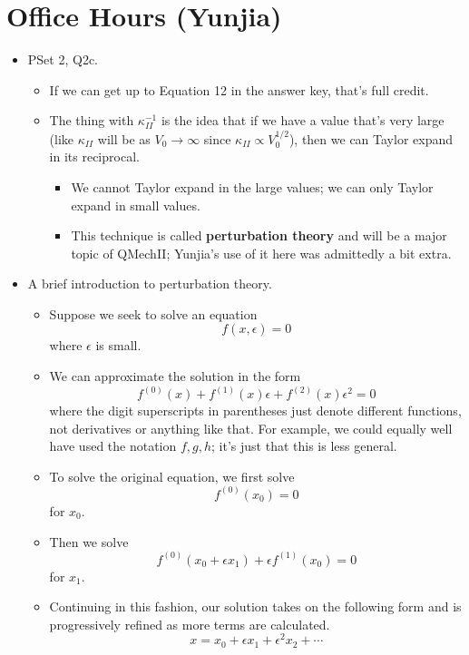 \documentclass[../notes.tex]{subfiles}
\begin{document}
\section{Office Hours (Yunjia)}
\begin{itemize}
    \item {}PSet 2, Q2c.
    \begin{itemize}
        \item If we can get up to Equation 12 in the answer key, that's full credit.
        \item The thing with $\kappa_{II}^{-1}$ is the idea that if we have a value that's very large (like $\kappa_{II}$ will be as $V_0\to\infty$ since $\kappa_{II}\propto V_0^{1/2}$), then we can Taylor expand in its reciprocal.
        \begin{itemize}
            \item We cannot Taylor expand in the large values; we can only Taylor expand in small values.
            \item This technique is called \textbf{perturbation theory} and will be a major topic of QMechII; Yunjia's use of it here was admittedly a bit extra.
        \end{itemize}
    \end{itemize}
    \item A brief introduction to perturbation theory.
    \begin{itemize}
        \item Suppose we seek to solve an equation
        \begin{equation*}
            f(x,\epsilon) = 0
        \end{equation*}
        where $\epsilon$ is small.
        \item We can approximate the solution in the form
        \begin{equation*}
            f^{(0)}(x)+f^{(1)}(x)\epsilon+f^{(2)}(x)\epsilon^2 = 0
        \end{equation*}
        where the digit superscripts in parentheses just denote different functions, not derivatives or anything like that. For example, we could equally well have used the notation $f,g,h$; it's just that this is less general.
        \item To solve the original equation, we first solve
        \begin{equation*}
            f^{(0)}(x_0) = 0
        \end{equation*}
        for $x_0$.
        \item Then we solve
        \begin{equation*}
            f^{(0)}(x_0+\epsilon x_1)+\epsilon f^{(1)}(x_0) = 0
        \end{equation*}
        for $x_1$.
        \item Continuing in this fashion, our solution takes on the following form and is progressively refined as more terms are calculated.
        \begin{equation*}
            x = x_0+\epsilon x_1+\epsilon^2x_2+\cdots
        \end{equation*}
    \end{itemize}
\end{itemize}
\end{document}
